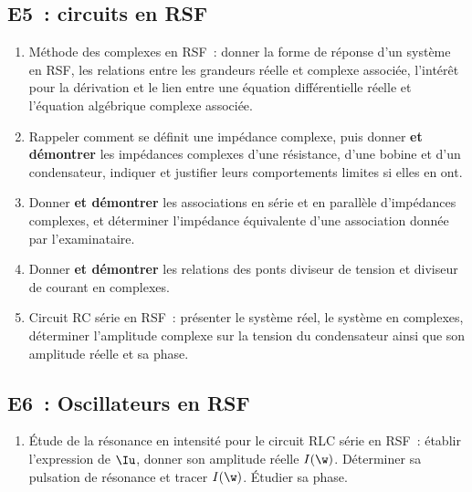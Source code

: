 \documentclass[a4paper, 12pt, final, garamond]{book}
\begin{document}
\subsection{E5~: circuits en RSF}
\begin{enumerate}[resume]
	\item Méthode des complexes en RSF~: donner la forme de réponse d'un système
	      en RSF, les relations entre les grandeurs réelle et complexe associée,
	      l'intérêt pour la dérivation et le lien entre une équation
	      différentielle réelle et l'équation algébrique complexe associée.
	\item Rappeler comment se définit une impédance complexe, puis donner
	      \textbf{et démontrer} les impédances complexes d'une résistance, d'une
	      bobine et d'un condensateur, indiquer et justifier leurs comportements
	      limites si elles en ont.
	\item Donner \textbf{et démontrer} les associations en série et en parallèle
	      d'impédances complexes, et déterminer l'impédance équivalente d'une
	      association donnée par l'examinataire.
	\item Donner \textbf{et démontrer} les relations des ponts diviseur de tension
	      et diviseur de courant en complexes.
	\item Circuit RC série en RSF~: présenter le système réel, le système en
	      complexes, déterminer l'amplitude complexe sur la tension du
	      condensateur ainsi que son amplitude réelle et sa phase.
\end{enumerate}

\subsection{E6~: Oscillateurs en RSF}
\begin{enumerate}[resume]
	\item Étude de la résonance en intensité pour le circuit RLC série en RSF~:
	      établir l'expression de $\Iu$, donner son amplitude réelle $I(\w)$.
	      Déterminer sa pulsation de résonance et tracer $I(\w)$. Étudier sa
	      phase.
\end{enumerate}
\end{document}
